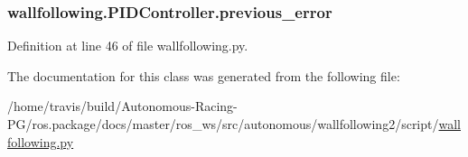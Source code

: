 \subsubsection[{\texorpdfstring{previous\+\_\+error}{previous_error}}]{\setlength{\rightskip}{0pt plus 5cm}wallfollowing.\+P\+I\+D\+Controller.\+previous\+\_\+error}\hypertarget{classwallfollowing_1_1_p_i_d_controller_a8f880f52e6d6f020769ab01d6459c908}{}\label{classwallfollowing_1_1_p_i_d_controller_a8f880f52e6d6f020769ab01d6459c908}


Definition at line 46 of file wallfollowing.\+py.



The documentation for this class was generated from the following file\+:\begin{DoxyCompactItemize}
\item 
/home/travis/build/\+Autonomous-\/\+Racing-\/\+P\+G/ros.\+package/docs/master/ros\+\_\+ws/src/autonomous/wallfollowing2/script/\hyperlink{wallfollowing_8py}{wallfollowing.\+py}\end{DoxyCompactItemize}

